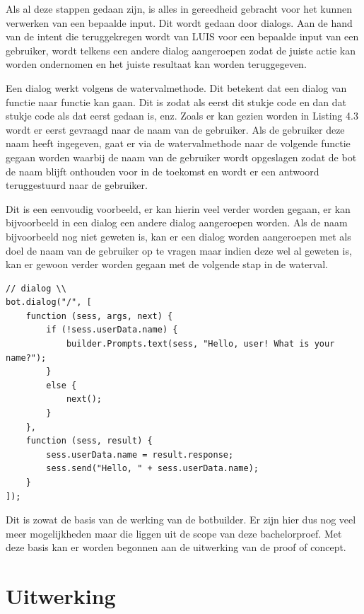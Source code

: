 Als al deze stappen gedaan zijn, is alles in gereedheid gebracht voor het kunnen verwerken van een bepaalde input. Dit wordt gedaan door dialogs. Aan de hand van de intent die teruggekregen wordt van LUIS voor een bepaalde input van een gebruiker, wordt telkens een andere dialog aangeroepen zodat de juiste actie kan worden ondernomen en het juiste resultaat kan worden teruggegeven.

Een dialog werkt volgens de watervalmethode. Dit betekent dat een dialog van functie naar functie kan gaan. Dit is zodat als eerst dit stukje code en dan dat stukje code als dat eerst gedaan is, enz. Zoals er kan gezien worden in Listing 4.3 wordt er eerst gevraagd naar de naam van de gebruiker. Als de gebruiker deze naam heeft ingegeven, gaat er via de watervalmethode naar de volgende functie gegaan worden waarbij de naam van de gebruiker wordt opgeslagen zodat de bot de naam blijft onthouden voor in de toekomst en wordt er een antwoord teruggestuurd naar de gebruiker.

Dit is een eenvoudig voorbeeld, er kan hierin veel verder worden gegaan, er kan bijvoorbeeld in een dialog een andere dialog aangeroepen worden. Als de naam bijvoorbeeld nog niet geweten is, kan er een dialog worden aangeroepen met als doel de naam van de gebruiker op te vragen maar indien deze wel al geweten is, kan er gewoon verder worden gegaan met de volgende stap in de waterval.

\medskip
\begin{lstlisting}[caption=Watervalmethode]
// dialog \\
bot.dialog("/", [
	function (sess, args, next) {
		if (!sess.userData.name) {
			builder.Prompts.text(sess, "Hello, user! What is your name?");
		}
		else {
			next();
		}
	},
	function (sess, result) {
		sess.userData.name = result.response;
		sess.send("Hello, " + sess.userData.name);
	}
]);
\end{lstlisting}

Dit is zowat de basis van de werking van de botbuilder. Er zijn hier dus nog veel meer mogelijkheden maar die liggen uit de scope van deze bachelorproef. Met deze basis kan er worden begonnen aan de uitwerking van de proof of concept.

\section{Uitwerking}
\label{sec:Uitwerking}


